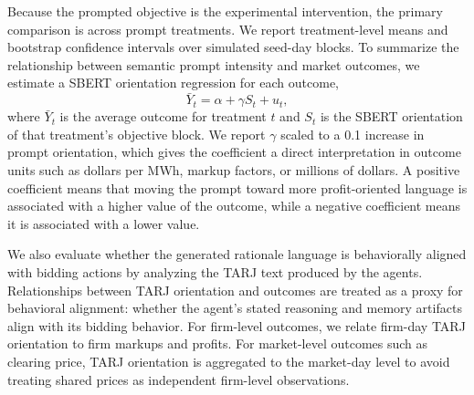 Because the prompted objective is the experimental intervention, the primary comparison is across prompt treatments. We report treatment-level means and bootstrap confidence intervals over simulated seed-day blocks. To summarize the relationship between semantic prompt intensity and market outcomes, we estimate a SBERT orientation regression for each outcome,
\begin{equation}
\bar{Y}_t=\alpha+\gamma S_t+u_t,
\label{eq:dose_response}
\end{equation}
where $\bar{Y}_t$ is the average outcome for treatment $t$ and $S_t$ is the SBERT orientation of that treatment's objective block. We report $\gamma$ scaled to a 0.1 increase in prompt orientation, which gives the coefficient a direct interpretation in outcome units such as dollars per MWh, markup factors, or millions of dollars. A positive coefficient means that moving the prompt toward more profit-oriented language is associated with a higher value of the outcome, while a negative coefficient means it is associated with a lower value.

We also evaluate whether the generated rationale language is behaviorally aligned with bidding actions by analyzing the TARJ text produced by the agents. Relationships between TARJ orientation and outcomes are treated as a proxy for behavioral alignment: whether the agent's stated reasoning and memory artifacts align with its bidding behavior. For firm-level outcomes, we relate firm-day TARJ orientation to firm markups and profits. For market-level outcomes such as clearing price, TARJ orientation is aggregated to the market-day level to avoid treating shared prices as independent firm-level observations.